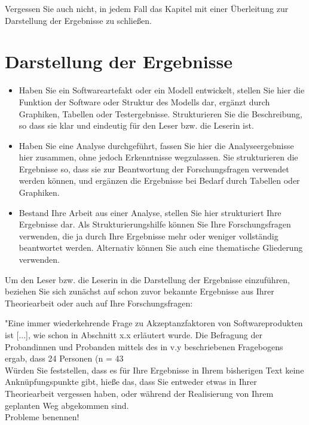 \documentclass{article}
\begin{document}
Vergessen Sie auch nicht, in jedem Fall das Kapitel mit einer Überleitung zur Darstellung der Ergebnisse zu schließen.

\section{Darstellung der Ergebnisse}

\begin{itemize}
    \item Haben Sie ein Softwareartefakt oder ein Modell entwickelt, stellen Sie hier die Funktion der Software oder Struktur des Modells dar, ergänzt durch Graphiken, Tabellen oder Testergebnisse. Strukturieren Sie die Beschreibung, so dass sie klar und eindeutig für den Leser bzw. die Leserin ist.
    \item Haben Sie eine Analyse durchgeführt, fassen Sie hier die Analyseergebnisse hier zusammen, ohne jedoch Erkenntnisse wegzulassen. Sie strukturieren die Ergebnisse so, dass sie zur Beantwortung der Forschungsfragen verwendet werden können, und ergänzen die Ergebnisse bei Bedarf durch Tabellen oder Graphiken.
    \item Bestand Ihre Arbeit aus einer Analyse, stellen Sie hier strukturiert Ihre Ergebnisse dar. Als Strukturierungshilfe können Sie Ihre Forschungsfragen verwenden, die ja durch Ihre Ergebnisse mehr oder weniger vollständig beantwortet werden. Alternativ können Sie auch eine thematische Gliederung verwenden. 
\end{itemize}

Um den Leser bzw. die Leserin in die Darstellung der Ergebnisse einzuführen, beziehen Sie sich zunächst auf schon zuvor bekannte Ergebnisse aus Ihrer Theoriearbeit oder auch auf Ihre Forschungsfragen:

"Eine immer wiederkehrende Frage zu Akzeptanzfaktoren von Softwareprodukten ist  [...], wie schon in Abschnitt x.x erläutert wurde. Die Befragung der Probandinnen und Probanden mittels des in v.y beschriebenen Fragebogens ergab, dass 24 Personen (n = 43 %
\\

Würden Sie feststellen, dass es für Ihre Ergebnisse in Ihrem bisherigen Text keine Anknüpfungspunkte gibt, hieße das, dass Sie entweder etwas in Ihrer Theoriearbeit vergessen haben, oder während der Realisierung von Ihrem geplanten Weg abgekommen sind.
\\

Probleme benennen!
\\
\end{document}
